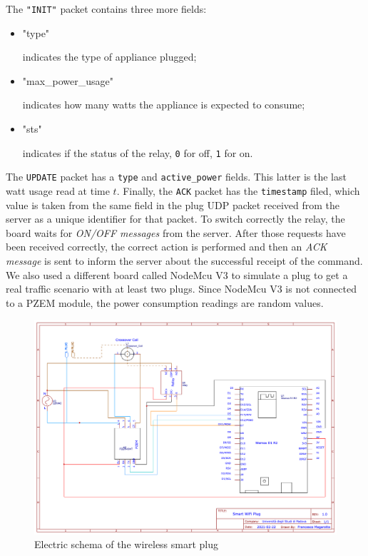 \documentclass[conference]{IEEEtran}
\begin{document}
	The \verb|"INIT"| packet contains three more fields:
	\begin{itemize}
		\item \begin{spverbatim}"type"\end{spverbatim} indicates the type of appliance plugged;
		\item \begin{spverbatim}"max_power_usage"\end{spverbatim} indicates how many watts the appliance is expected to consume;
		\item \begin{spverbatim}"sts"\end{spverbatim} indicates if the status of the relay, \verb|0| for off, \verb|1| for on.
	\end{itemize}
	The \verb|UPDATE| packet has a \verb|type| and \verb|active_power| fields. This latter is the last watt usage read at time $t$. Finally, the \verb|ACK| packet has the \verb|timestamp| filed, which value is taken from the same field in the plug UDP packet received from the server as a unique identifier for that packet.
	To switch correctly the relay, the board waits for \textit{ON/OFF messages} from the server. After those requests have been received correctly, the correct action is performed and then an \textit{ACK message} is sent to inform the server about the successful receipt of the command. 
	We also used a different board called NodeMcu V3 to simulate a plug to get a real traffic scenario with at least two plugs. Since NodeMcu V3 is not connected to a PZEM module, the power consumption readings are random values.  
	\begin{figure}[htbp]
		\centering
		\includegraphics[width=\linewidth]{assets/pcb_schema}
		\caption{Electric schema of the wireless smart plug}
		\label{fig:pcbschema}
	\end{figure}
\end{document}
